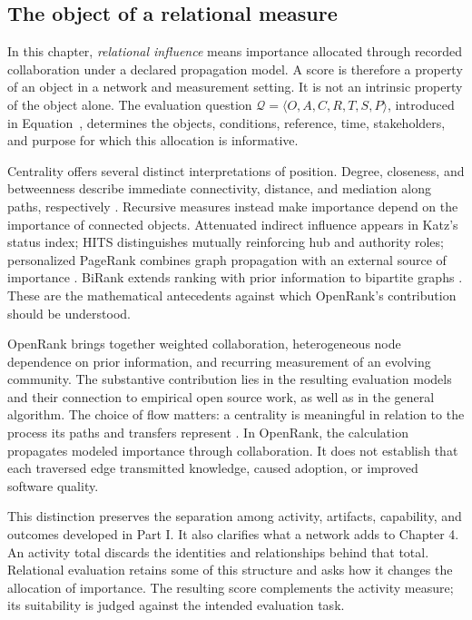 \subsection{The object of a relational measure}
In this chapter, \emph{relational influence} means importance allocated through recorded collaboration under a declared propagation model. A score is therefore a property of an object in a network and measurement setting. It is not an intrinsic property of the object alone. The evaluation question \(\mathcal Q=\langle O,A,C,R,T,S,P\rangle\), introduced in Equation~, determines the objects, conditions, reference, time, stakeholders, and purpose for which this allocation is informative.

Centrality offers several distinct interpretations of position. Degree, closeness, and betweenness describe immediate connectivity, distance, and mediation along paths, respectively \citep{freeman1979}. Recursive measures instead make importance depend on the importance of connected objects. Attenuated indirect influence appears in Katz's status index; HITS distinguishes mutually reinforcing hub and authority roles; personalized PageRank combines graph propagation with an external source of importance \citep{katz1953,kleinberg1999,gleich2015}. BiRank extends ranking with prior information to bipartite graphs \citep{he2017}. These are the mathematical antecedents against which OpenRank's contribution should be understood.

OpenRank brings together weighted collaboration, heterogeneous node dependence on prior information, and recurring measurement of an evolving community. The substantive contribution lies in the resulting evaluation models and their connection to empirical open source work, as well as in the general algorithm. The choice of flow matters: a centrality is meaningful in relation to the process its paths and transfers represent \citep{borgatti2005}. In OpenRank, the calculation propagates modeled importance through collaboration. It does not establish that each traversed edge transmitted knowledge, caused adoption, or improved software quality.

This distinction preserves the separation among activity, artifacts, capability, and outcomes developed in Part I. It also clarifies what a network adds to Chapter 4. An activity total discards the identities and relationships behind that total. Relational evaluation retains some of this structure and asks how it changes the allocation of importance. The resulting score complements the activity measure; its suitability is judged against the intended evaluation task.

